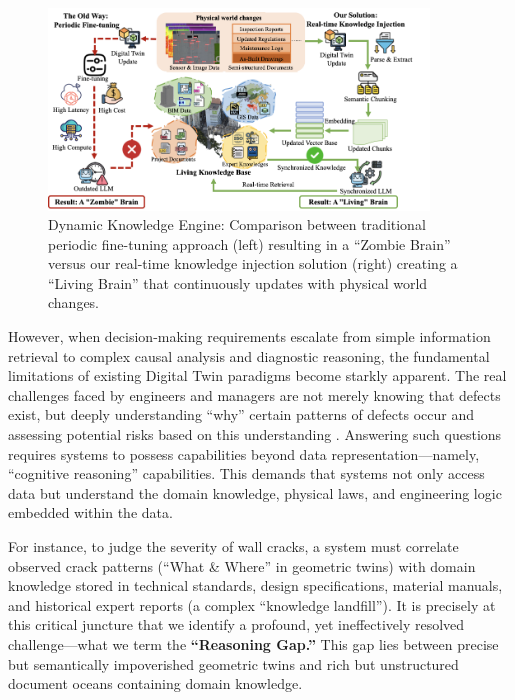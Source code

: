\begin{figure}[htbp]
\centering
\includegraphics[width=0.9\textwidth]{figures/DefectGPT/Dynamic Knowledge Engine.png}
\caption{Dynamic Knowledge Engine: Comparison between traditional periodic fine-tuning approach (left) resulting in a ``Zombie Brain'' versus our real-time knowledge injection solution (right) creating a ``Living Brain'' that continuously updates with physical world changes.}
\label{fig:dynamic-knowledge-engine}
\end{figure}

However, when decision-making requirements escalate from simple information retrieval to complex causal analysis and diagnostic reasoning, the fundamental limitations of existing Digital Twin paradigms become starkly apparent. The real challenges faced by engineers and managers are not merely knowing that defects exist, but deeply understanding ``why'' certain patterns of defects occur and assessing potential risks based on this understanding \cite{hamdan2021semantic}. Answering such questions requires systems to possess capabilities beyond data representation—namely, ``cognitive reasoning'' capabilities. This demands that systems not only access data but understand the domain knowledge, physical laws, and engineering logic embedded within the data.

For instance, to judge the severity of wall cracks, a system must correlate observed crack patterns (``What \& Where'' in geometric twins) with domain knowledge stored in technical standards, design specifications, material manuals, and historical expert reports (a complex ``knowledge landfill''). It is precisely at this critical juncture that we identify a profound, yet ineffectively resolved challenge—what we term the \textbf{``Reasoning Gap.''} This gap lies between precise but semantically impoverished geometric twins and rich but unstructured document oceans containing domain knowledge.

